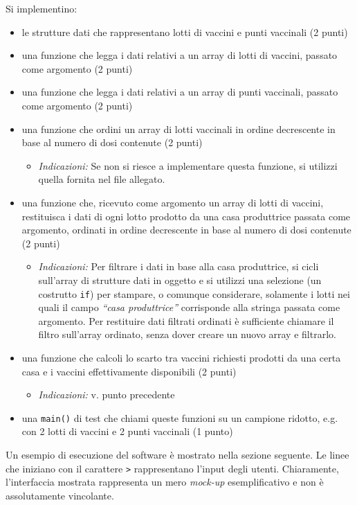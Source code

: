 \documentclass[a4paper, 11pt]{exam}
\begin{document}
Si implementino:
\begin{itemize}
	\item le strutture dati che rappresentano lotti di vaccini e punti vaccinali (2 punti)
	\item una funzione che legga i dati relativi a un array di lotti di vaccini, passato come argomento (2 punti)
	\item una funzione che legga i dati relativi a un array di punti vaccinali, passato come argomento (2 punti)
	\item una funzione che ordini un array di lotti vaccinali in ordine decrescente in base al numero di dosi contenute (2 punti)
		\begin{itemize}
			\item \emph{Indicazioni: } Se non si riesce a implementare questa funzione, si utilizzi quella fornita nel file allegato. 
		\end{itemize}
	\item una funzione che, ricevuto come argomento un array di lotti di vaccini, restituisca i dati di ogni lotto prodotto da una casa produttrice passata come argomento, ordinati in ordine decrescente in base al numero di dosi contenute (2 punti)
		\begin{itemize}
			\item \emph{Indicazioni:} Per filtrare i dati in base alla casa produttrice, si cicli sull'array di strutture dati in oggetto e si utilizzi una selezione (un costrutto \texttt{if}) per stampare, o comunque considerare, solamente i lotti nei quali il campo \emph{``casa produttrice''} corrisponde alla stringa passata come argomento.
Per restituire dati filtrati ordinati è sufficiente chiamare il filtro sull'array ordinato, senza dover creare un nuovo array e filtrarlo. 
		\end{itemize}
	\item una funzione che calcoli lo scarto tra vaccini richiesti prodotti da una certa casa e i vaccini effettivamente disponibili (2 punti)
		\begin{itemize}
			\item \emph{Indicazioni:} v. punto precedente
		\end{itemize}
	\item una \texttt{main()} di test che chiami queste funzioni su un campione ridotto, e.g. con 2 lotti di vaccini e 2 punti vaccinali (1 punto)
\end{itemize}

Un esempio di esecuzione del software è mostrato nella sezione seguente.
Le linee che iniziano con il carattere \texttt{>} rappresentano l'input degli utenti.
Chiaramente, l'interfaccia mostrata rappresenta un mero \textit{mock-up} esemplificativo e non è assolutamente vincolante.
\end{document}
